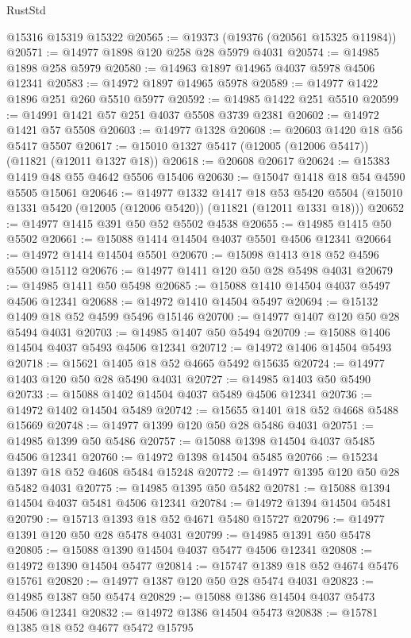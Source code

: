 \begin{lexlean}{RustStd}
\begin{coremodule}
    @15316
    @15319
    @15322
@20565 := @19373 (@19376 (@20561 @15325 @11984))
@20571 := @14977 @1898 @120 @258 @28 @5979 @4031
@20574 := @14985 @1898 @258 @5979
@20580 := @14963 @1897 @14965 @4037 @5978 @4506 @12341
@20583 := @14972 @1897 @14965 @5978
@20589 := @14977 @1422 @1896 @251 @260 @5510 @5977
@20592 := @14985 @1422 @251 @5510
@20599 := @14991 @1421 @57 @251 @4037 @5508 @3739 @2381
@20602 := @14972 @1421 @57 @5508
@20603 := @14977 @1328
@20608 := @20603 @1420 @18 @56 @5417 @5507
@20617 := @15010 @1327 @5417 (@12005 (@12006 @5417)) (@11821 (@12011 @1327 @18))
@20618 := @20608 @20617
@20624 := @15383 @1419 @48 @55 @4642 @5506 @15406
@20630 := @15047 @1418 @18 @54 @4590 @5505 @15061
@20646 := @14977
    @1332
    @1417
    @18
    @53
    @5420
    @5504
    (@15010 @1331 @5420 (@12005 (@12006 @5420)) (@11821 (@12011 @1331 @18)))
@20652 := @14977 @1415 @391 @50 @52 @5502 @4538
@20655 := @14985 @1415 @50 @5502
@20661 := @15088 @1414 @14504 @4037 @5501 @4506 @12341
@20664 := @14972 @1414 @14504 @5501
@20670 := @15098 @1413 @18 @52 @4596 @5500 @15112
@20676 := @14977 @1411 @120 @50 @28 @5498 @4031
@20679 := @14985 @1411 @50 @5498
@20685 := @15088 @1410 @14504 @4037 @5497 @4506 @12341
@20688 := @14972 @1410 @14504 @5497
@20694 := @15132 @1409 @18 @52 @4599 @5496 @15146
@20700 := @14977 @1407 @120 @50 @28 @5494 @4031
@20703 := @14985 @1407 @50 @5494
@20709 := @15088 @1406 @14504 @4037 @5493 @4506 @12341
@20712 := @14972 @1406 @14504 @5493
@20718 := @15621 @1405 @18 @52 @4665 @5492 @15635
@20724 := @14977 @1403 @120 @50 @28 @5490 @4031
@20727 := @14985 @1403 @50 @5490
@20733 := @15088 @1402 @14504 @4037 @5489 @4506 @12341
@20736 := @14972 @1402 @14504 @5489
@20742 := @15655 @1401 @18 @52 @4668 @5488 @15669
@20748 := @14977 @1399 @120 @50 @28 @5486 @4031
@20751 := @14985 @1399 @50 @5486
@20757 := @15088 @1398 @14504 @4037 @5485 @4506 @12341
@20760 := @14972 @1398 @14504 @5485
@20766 := @15234 @1397 @18 @52 @4608 @5484 @15248
@20772 := @14977 @1395 @120 @50 @28 @5482 @4031
@20775 := @14985 @1395 @50 @5482
@20781 := @15088 @1394 @14504 @4037 @5481 @4506 @12341
@20784 := @14972 @1394 @14504 @5481
@20790 := @15713 @1393 @18 @52 @4671 @5480 @15727
@20796 := @14977 @1391 @120 @50 @28 @5478 @4031
@20799 := @14985 @1391 @50 @5478
@20805 := @15088 @1390 @14504 @4037 @5477 @4506 @12341
@20808 := @14972 @1390 @14504 @5477
@20814 := @15747 @1389 @18 @52 @4674 @5476 @15761
@20820 := @14977 @1387 @120 @50 @28 @5474 @4031
@20823 := @14985 @1387 @50 @5474
@20829 := @15088 @1386 @14504 @4037 @5473 @4506 @12341
@20832 := @14972 @1386 @14504 @5473
@20838 := @15781 @1385 @18 @52 @4677 @5472 @15795

\end{coremodule}
\end{lexlean}

